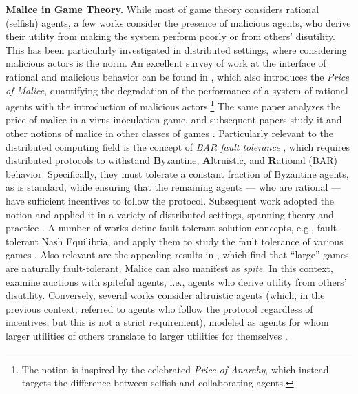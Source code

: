 \documentclass[sigconf,nonacm]{aamas}
\begin{document}
\noindent\textbf{Malice in Game Theory.} While most of game theory considers rational (selfish) agents, a few works consider the presence of malicious agents, who derive their utility from making the system perform poorly or from others' disutility. This has been particularly investigated in distributed settings, where considering malicious actors is the norm. An excellent survey of work at the interface of rational and malicious behavior can be found in \cite{the_price_of_malice}, which also introduces the \emph{Price of Malice}, quantifying the degradation of the performance of a system of rational agents with the introduction of malicious actors.\footnote{The notion is inspired by the celebrated \emph{Price of Anarchy}, which instead targets the difference between selfish and collaborating agents.} The same paper analyzes the price of malice in a virus inoculation game, and subsequent papers study it and other notions of malice in other classes of games \cite{roth_congestion, babaioff, chakrabarty2009effectmalicesocialoptimum}. Particularly relevant to the distributed computing field is the concept of \emph{BAR fault tolerance} \cite{aiyer}, which requires distributed protocols to withstand \textbf{B}yzantine, \textbf{A}ltruistic, and \textbf{R}ational (BAR) behavior. Specifically, they must tolerate a constant fraction of Byzantine agents, as is standard, while ensuring that the remaining agents --- who are rational --- have sufficient incentives to follow the protocol. Subsequent work adopted the notion and applied it in a variety of distributed settings, spanning theory and practice \cite{bar_2, bar_3, FlightPath}. A number of works define fault-tolerant solution concepts, e.g., fault-tolerant Nash Equilibria, and apply them to study the fault tolerance of various games \cite{eliaz, karakostas_viglas}. Also relevant are the appealing results in \cite{gradwohl}, which find that ``large'' games are naturally fault-tolerant. Malice can also manifest as \emph{spite}. In this context, \cite{brandt, MorganSteiglitzReis} examine auctions with spiteful agents, i.e., agents who derive utility from others' disutility. Conversely, several works consider altruistic agents (which, in the previous context, referred to agents who follow the protocol regardless of incentives, but this is not a strict requirement), modeled as agents for whom larger utilities of others translate to larger utilities for themselves \cite{hoefer_skopalik, meier_yvonne_stefan_roger}.
\end{document}
